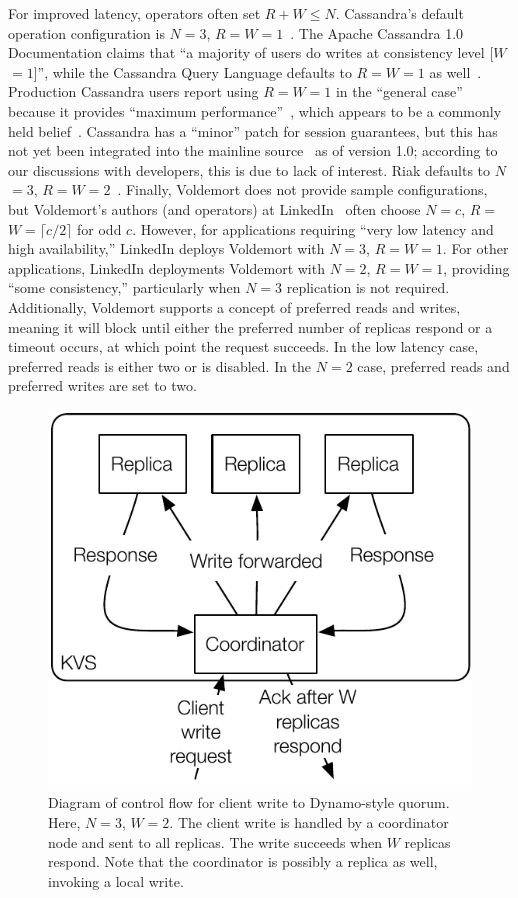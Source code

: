 \documentclass{vldb}
\begin{document}
For improved latency, operators often set $R+W \leq N$. Cassandra's
default operation configuration is $N$$=$$3$,
$R$$=$$W$$=$$1$~\cite{cassandradefault}. The Apache Cassandra 1.0
Documentation claims that ``a majority of users do writes at
consistency level [$W$$=$$1$]'', while the Cassandra Query Language
defaults to $R$$=$$W$$=$$1$ as well~\cite{cassandra-docs}.  Production
Cassandra users report using $R$$=$$W$$=$$1$ in the ``general case''
because it provides ``maximum performance''~\cite{maxperfblog}, which
appears to be a commonly held belief~\cite{reddit, outbrain}.
Cassandra has a ``minor'' patch for session guarantees, but this has
not yet been integrated into the mainline
source~\cite{cassandra-session} as of version 1.0; according to our
discussions with developers, this is due to lack of interest. Riak
defaults to $N$$=$$3$, $R$$=$$W$$=$$2$~\cite{riakdefault-n,
  riakdefault-rw}.  Finally, Voldemort does not provide sample
configurations, but Voldemort's authors (and operators) at
LinkedIn~\cite{feinbergpc} often choose $N$$=$$c$, $R$$=$$W$$=$$
\lceil c/2 \rceil$ for odd $c$.  However, for applications requiring
``very low latency and high availability,'' LinkedIn deploys Voldemort
with $N$$=$$3$, $R$$=$$W$$=$$1$.  For other applications, LinkedIn
deployments Voldemort with $N$$=$$2$, $R$$=$$W$$=$$1$, providing
``some consistency,'' particularly when $N$$=$$3$ replication is not
required.  Additionally, Voldemort supports a concept of preferred
reads and writes, meaning it will block until either the preferred
number of replicas respond or a timeout occurs, at which point the
request succeeds.  In the low latency case, preferred reads is either
two or is disabled.  In the $N$$=$$2$ case, preferred reads and
preferred writes are set to two.

\begin{figure}
\centering
\includegraphics[width=.8\columnwidth]{figs/dynamo-quorum.pdf}
\caption{Diagram of control flow for client write to Dynamo-style
  quorum.  Here, $N=3$, $W=2$. The client write is handled by a
  coordinator node and sent to all replicas. The write succeeds when
  $W$ replicas respond.  Note that the coordinator is possibly a
  replica as well, invoking a local write.}
\label{fig:dynamo-quorum}
\end{figure}
\end{document}
